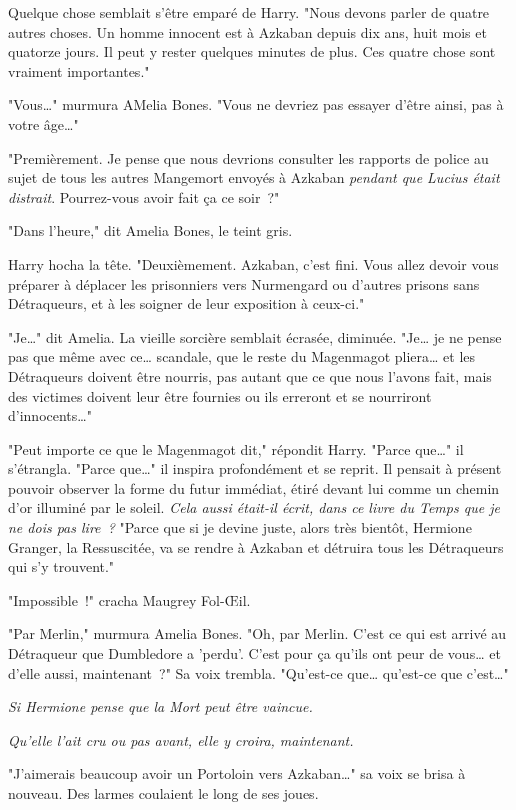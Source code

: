 Quelque chose semblait s'être emparé de Harry. "Nous devons parler de quatre autres choses. Un homme innocent est à Azkaban depuis dix ans, huit mois et quatorze jours. Il peut y rester quelques minutes de plus. Ces quatre chose sont vraiment importantes."

"Vous…" murmura AMelia Bones. "Vous ne devriez pas essayer d'être ainsi, pas à votre âge…"

"Premièrement. Je pense que nous devrions consulter les rapports de police au sujet de tous les autres Mangemort envoyés à Azkaban \emph{pendant que Lucius était distrait}. Pourrez-vous avoir fait ça ce soir~?"

"Dans l'heure," dit Amelia Bones, le teint gris.

Harry hocha la tête. "Deuxièmement. Azkaban, c'est fini. Vous allez devoir vous préparer à déplacer les prisonniers vers Nurmengard ou d'autres prisons sans Détraqueurs, et à les soigner de leur exposition à ceux-ci."

"Je…" dit Amelia. La vieille sorcière semblait écrasée, diminuée. "Je… je ne pense pas que même avec ce… scandale, que le reste du Magenmagot pliera… et les Détraqueurs doivent être nourris, pas autant que ce que nous l'avons fait, mais des victimes doivent leur être fournies ou ils erreront et se nourriront d'innocents…"

"Peut importe ce que le Magenmagot dit," répondit Harry. "Parce que…" il s'étrangla. "Parce que…" il inspira profondément et se reprit. Il pensait à présent pouvoir observer la forme du futur immédiat, étiré devant lui comme un chemin d'or illuminé par le soleil. \emph{Cela aussi était-il écrit, dans ce livre du Temps que je ne dois pas lire~?} "Parce que si je devine juste, alors très bientôt, Hermione Granger, la Ressuscitée, va se rendre à Azkaban et détruira tous les Détraqueurs qui s'y trouvent."

"Impossible~!" cracha Maugrey Fol-Œil.

"Par Merlin," murmura Amelia Bones. "Oh, par Merlin. C'est ce qui est arrivé au Détraqueur que Dumbledore a 'perdu'. C'est pour ça qu'ils ont peur de vous… et d'elle aussi, maintenant~?" Sa voix trembla. "Qu'est-ce que… qu'est-ce que c'est…"

\emph{Si Hermione pense que la Mort peut être vaincue.}

\emph{Qu'elle l'ait cru ou pas avant, elle y croira, maintenant.}

"J'aimerais beaucoup avoir un Portoloin vers Azkaban…" sa voix se brisa à nouveau. Des larmes coulaient le long de ses joues.

